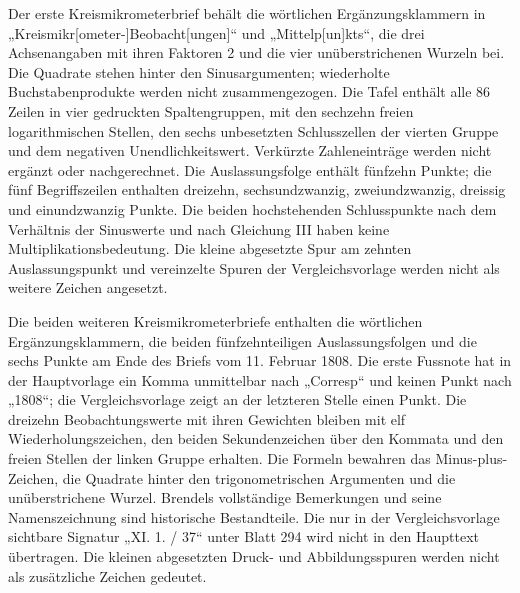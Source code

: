 {\raggedright
Der erste Kreismikrometerbrief behält die wörtlichen Ergänzungsklammern in „Kreismikr[ometer-]Beobacht[ungen]“ und „Mittelp[un]kts“, die drei Achsenangaben mit ihren Faktoren 2 und die vier unüberstrichenen Wurzeln bei. Die Quadrate stehen hinter den Sinusargumenten; wiederholte Buchstabenprodukte werden nicht zusammengezogen. Die Tafel enthält alle 86 Zeilen in vier gedruckten Spaltengruppen, mit den sechzehn freien logarithmischen Stellen, den sechs unbesetzten Schlusszellen der vierten Gruppe und dem negativen Unendlichkeitswert. Verkürzte Zahleneinträge werden nicht ergänzt oder nachgerechnet. Die Auslassungsfolge enthält fünfzehn Punkte; die fünf Begriffszeilen enthalten dreizehn, sechsundzwanzig, zweiundzwanzig, dreissig und einundzwanzig Punkte. Die beiden hochstehenden Schlusspunkte nach dem Verhältnis der Sinuswerte und nach Gleichung III haben keine Multiplikationsbedeutung. Die kleine abgesetzte Spur am zehnten Auslassungspunkt und vereinzelte Spuren der Vergleichsvorlage werden nicht als weitere Zeichen angesetzt.\par}


Die beiden weiteren Kreismikrometerbriefe enthalten die wörtlichen Ergänzungsklammern, die beiden fünfzehnteiligen Auslassungsfolgen und die sechs Punkte am Ende des Briefs vom 11. Februar 1808. Die erste Fussnote hat in der Hauptvorlage ein Komma unmittelbar nach „Corresp“ und keinen Punkt nach „1808“; die Vergleichsvorlage zeigt an der letzteren Stelle einen Punkt. Die dreizehn Beobachtungswerte mit ihren Gewichten bleiben mit elf Wiederholungszeichen, den beiden Sekundenzeichen über den Kommata und den freien Stellen der linken Gruppe erhalten. Die Formeln bewahren das Minus-plus-Zeichen, die Quadrate hinter den trigonometrischen Argumenten und die unüberstrichene Wurzel. Brendels vollständige Bemerkungen und seine Namenszeichnung sind historische Bestandteile. Die nur in der Vergleichsvorlage sichtbare Signatur „XI. 1. / 37“ unter Blatt 294 wird nicht in den Haupttext übertragen. Die kleinen abgesetzten Druck- und Abbildungsspuren werden nicht als zusätzliche Zeichen gedeutet.

